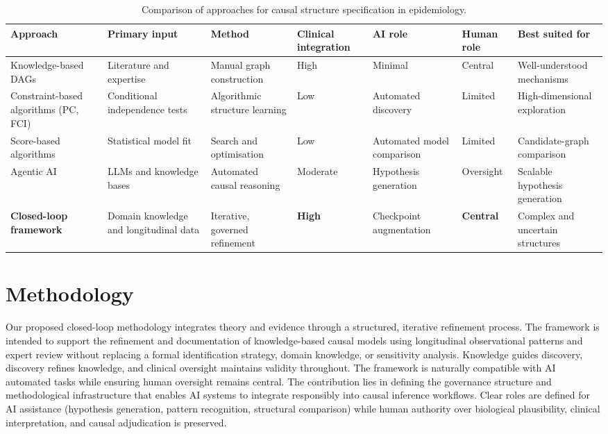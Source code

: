 \documentclass[sn-vancouver-num]{sn-jnl}
\begin{document}
\begin{table}[h]
\caption{Comparison of approaches for causal structure specification in epidemiology.}
\label{tab:sota}
\centering
\footnotesize
\setlength{\tabcolsep}{3.5pt}
\renewcommand{\arraystretch}{1.15}
\begin{tabularx}{\textwidth}{@{}>{\raggedright\arraybackslash}p{2.6cm}YYYYYY@{}}
\toprule
\textbf{Approach} & \textbf{Primary input} & \textbf{Method} & \textbf{Clinical integration} & \textbf{AI role} & \textbf{Human role} & \textbf{Best suited for} \\
\midrule
Knowledge-based DAGs \citep{greenland1999} & Literature and expertise & Manual graph construction & High & Minimal & Central & Well-understood mechanisms \\
Constraint-based algorithms (PC, FCI) \citep{chickering2002} & Conditional independence tests & Algorithmic structure learning & Low & Automated discovery & Limited & High-dimensional exploration \\
Score-based algorithms \citep{chickering2002} & Statistical model fit & Search and optimisation & Low & Automated model comparison & Limited & Candidate-graph comparison \\
Agentic AI \citep{chickering2002} & LLMs and knowledge bases & Automated causal reasoning & Moderate & Hypothesis generation & Oversight & Scalable hypothesis generation \\
\textbf{Closed-loop framework} & Domain knowledge and longitudinal data & Iterative, governed refinement & \textbf{High} & Checkpoint augmentation & \textbf{Central} & Complex and uncertain structures \\
\bottomrule
\end{tabularx}
\end{table}

\section{Methodology}
Our proposed closed-loop methodology integrates theory and evidence through a structured, iterative refinement process. The framework is intended to support the refinement and documentation of knowledge-based causal models using longitudinal observational patterns and expert review without replacing a formal identification strategy, domain knowledge, or sensitivity analysis. Knowledge guides discovery, discovery refines knowledge, and clinical oversight maintains validity throughout. The framework is naturally compatible with AI automated tasks while ensuring human oversight remains central. The contribution lies in defining the governance structure and methodological infrastructure that enables AI systems to integrate responsibly into causal inference workflows. Clear roles are defined for AI assistance (hypothesis generation, pattern recognition, structural comparison) while human authority over biological plausibility, clinical interpretation, and causal adjudication is preserved.
\end{document}
